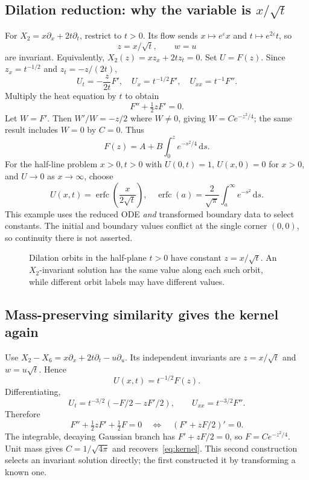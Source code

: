 \documentclass[11pt,a4paper]{article}
\numberwithin{equation}{section}
\theoremstyle{definition}
\theoremstyle{plain}
\theoremstyle{remark}
\newcommand{\dd}{\,\mathrm d}
\begin{document}
\subsection{Dilation reduction: why the variable is \texorpdfstring{$x/\sqrt t$}{x over sqrt t}}
For $X_2=x\partial_x+2t\partial_t$, restrict to $t>0$. Its flow sends $x\mapsto e^\varepsilon x$ and $t\mapsto e^{2\varepsilon}t$, so
\[
z=x/\sqrt t,\qquad w=u
\]
are invariant. Equivalently, $X_2(z)=xz_x+2tz_t=0$. Set $U=F(z)$. Since $z_x=t^{-1/2}$ and $z_t=-z/(2t)$,
\[
U_t=-\frac{z}{2t}F',\quad U_x=t^{-1/2}F',\quad U_{xx}=t^{-1}F''.
\]
Multiply the heat equation by $t$ to obtain
\[
F''+\tfrac12 zF'=0.
\]
Let $W=F'$. Then $W'/W=-z/2$ where $W\ne0$, giving $W=C e^{-z^2/4}$; the same result includes $W=0$ by $C=0$. Thus
\[
F(z)=A+B\int_0^z e^{-s^2/4}\dd s.
\]
For the half-line problem $x>0,t>0$ with $U(0,t)=1$, $U(x,0)=0$ for $x>0$, and $U\to0$ as $x\to\infty$, choose
\[
\boxed{U(x,t)=\operatorname{erfc}\!\left(\frac{x}{2\sqrt t}\right),\quad
\operatorname{erfc}(a)=\frac2{\sqrt\pi}\int_a^\infty e^{-s^2}\dd s.}
\]
This example uses the reduced ODE \emph{and} transformed boundary data to select constants. The initial and boundary values conflict at the single corner $(0,0)$, so continuity there is not asserted.

\begin{figure}[htbp]\centering
{}
\caption{Dilation orbits in the half-plane $t>0$ have constant $z=x/\sqrt t$. An $X_2$-invariant solution has the same value along each such orbit, while different orbit labels may have different values.}
\end{figure}

\subsection{Mass-preserving similarity gives the kernel again}
Use $X_2-X_6=x\partial_x+2t\partial_t-u\partial_u$. Its independent invariants are $z=x/\sqrt t$ and $w=u\sqrt t$. Hence
\[
U(x,t)=t^{-1/2}F(z).
\]
Differentiating,
\[
U_t=t^{-3/2}(-F/2-zF'/2),\qquad U_{xx}=t^{-3/2}F''.
\]
Therefore
\[
F''+\tfrac12 zF'+\tfrac12F=0
\quad\Longleftrightarrow\quad (F'+zF/2)'=0.
\]
The integrable, decaying Gaussian branch has $F'+zF/2=0$, so $F=C e^{-z^2/4}$. Unit mass gives $C=1/\sqrt{4\pi}$ and recovers~\eqref{eq:kernel}. This second construction selects an invariant solution directly; the first constructed it by transforming a known one.
\end{document}
